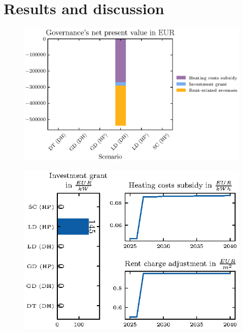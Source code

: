 \section{Results and discussion}\label{results}


\begin{figure}[h]
	\centering
	\includegraphics[width=1\linewidth]{figures/4_Results/fig_npv_comparison/net_present_value.eps}
	\caption{}
	\label{fig:npv_comparison}
\end{figure}

\begin{figure}[h]
	\centering
	\includegraphics[width=1\linewidth]{figures/4_Results/fig_rent_subsidy_development/price_dev.eps}
	\caption{}
	\label{fig:sub_rent_dev}
\end{figure}


